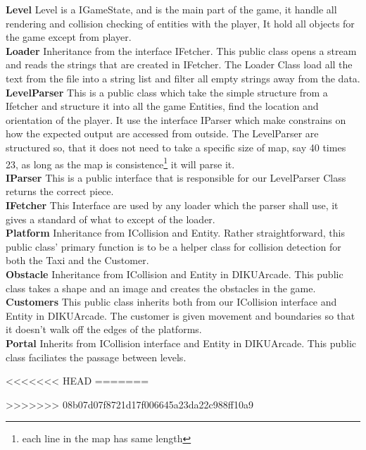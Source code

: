 \documentclass[../master.tex]{subfiles}
\begin{document}
\textbf{Level}
Level is a IGameState, and is the main part of the game, it handle all rendering and collision checking of entities with the player, It hold all objects for the game except from player.\\

\textbf{Loader}
Inheritance from the interface IFetcher. This public class opens a stream and reads the strings that are created in IFetcher. The Loader Class load all the text from the file into a string list and filter all empty strings away from the data.\\

\textbf{LevelParser}
This is a public class which take the simple structure from a Ifetcher and structure it into all the game Entities, find the location and orientation of the player. It use the interface IParser which make constrains on how the expected output are accessed from outside. The LevelParser are structured so, that it does not need to take a specific size of map, say 40 times 23, as long as the map is consistence\footnote{each line in the map has same length} it will parse it.\\

\textbf{IParser}
This is a public interface that is responsible for our LevelParser Class returns the correct piece.\\

\textbf{IFetcher}
This Interface are used by any loader which the parser shall use, it gives a standard of what to except of the loader.\\

\textbf{Platform}
Inheritance from ICollision and Entity. Rather straightforward, this public class' primary function is to be a helper class for collision detection for both the Taxi and the Customer.\\

\textbf{Obstacle} 
Inheritance from ICollision and Entity in DIKUArcade. This public class takes a shape and an image and creates the obstacles in the game.\\

\textbf{Customers}
This public class inherits both from our ICollision interface and Entity in DIKUArcade. The customer is given movement and boundaries so that it doesn't walk off the edges of the platforms.\\

\textbf{Portal}
Inherits from ICollision interface and Entity in DIKUArcade. This public class faciliates the passage between levels.

<<<<<<< HEAD
=======

>>>>>>> 08b07d07f8721d17f006645a23da22c988ff10a9
\end{document}
